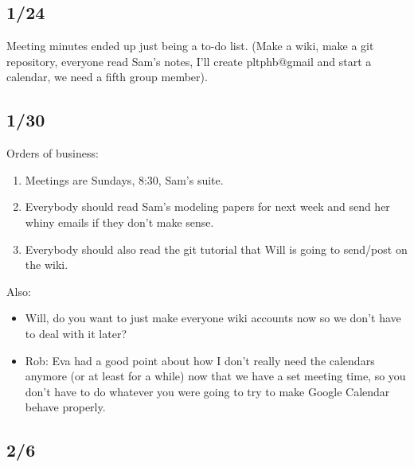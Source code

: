\subsection*{1/24}

Meeting minutes ended up just being a to-do list. (Make a wiki, make a
git repository, everyone read Sam's notes, I’ll create pltphb@gmail
and start a calendar, we need a fifth group member).  

\subsection*{1/30}

Orders of business:
\begin{enumerate}
\item Meetings are Sundays, 8:30, Sam's suite. 
\item Everybody should read Sam's modeling papers for next week and
  send her whiny emails if they don't make sense.
\item Everybody should also read the git tutorial that Will is going
  to send/post on the wiki.
\end{enumerate}

Also:
\begin{itemize}
\item Will, do you want to just make everyone wiki accounts now so we
  don't have to deal with it later?  
\item Rob: Eva had a good point about how I don't really need the
  calendars anymore (or at least for a while) now that we have a set
  meeting time, so you don't have to do whatever you were going to try
  to make Google Calendar behave properly.
\end{itemize}

\subsection*{2/6}

